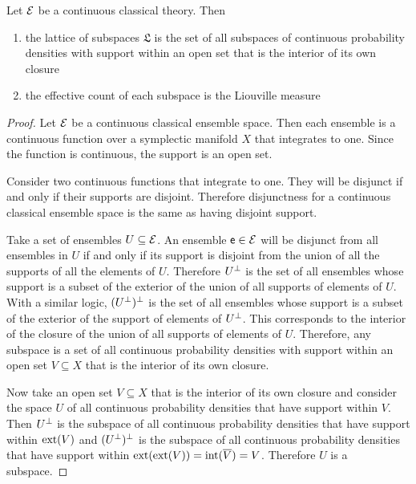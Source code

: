 \begin{conj}
	Let $\mathcal{E}$ be a continuous classical theory. Then
	\begin{enumerate}
		\item the lattice of subspaces $\mathfrak{L}$ is the set of all subspaces of continuous probability densities with support within an open set that is the interior of its own closure
		\item the effective count of each subspace is the Liouville measure
	\end{enumerate}
\end{conj}

\begin{proof}
	Let $\mathcal{E}$ be a continuous classical ensemble space. Then each ensemble is a continuous function over a symplectic manifold $X$ that integrates to one. Since the function is continuous, the support is an open set.
	
	Consider two continuous functions that integrate to one. They will be disjunct if and only if their supports are disjoint. Therefore disjunctness for a continuous classical ensemble space is the same as having disjoint support.
	
	Take a set of ensembles $U \subseteq \mathcal{E}$. An ensemble $\mathsf{e} \in \mathcal{E}$ will be disjunct from all ensembles in $U$ if and only if its support is disjoint from the union of all the supports of all the elements of $U$. Therefore $U^\perp$ is the set of all ensembles whose support is a subset of the exterior of the union of all supports of elements of $U$. With a similar logic, $(U^\perp)^\perp$ is the set of all ensembles whose support is a subset of the exterior of the support of elements of $U^\perp$. This corresponds to the interior of the closure of the union  of all supports of elements of $U$. Therefore, any subspace is a set of all continuous probability densities with support within an open set $V \subseteq X$ that is the interior of its own closure.
	
	Now take an open set $V \subseteq X$ that is the interior of its own closure and consider the space $U$ of all continuous probability densities that have support within $V$. Then $U^\perp$ is the subspace of all continuous probability densities that have support within $\operatorname{ext}(V)$ and $(U^\perp)^\perp$ is the subspace of all continuous probability densities that have support within $\operatorname{ext}(\operatorname{ext}(V)) = \operatorname{int}(\overline{V}) = V$. Therefore $U$ is a subspace.
	

\end{proof}

